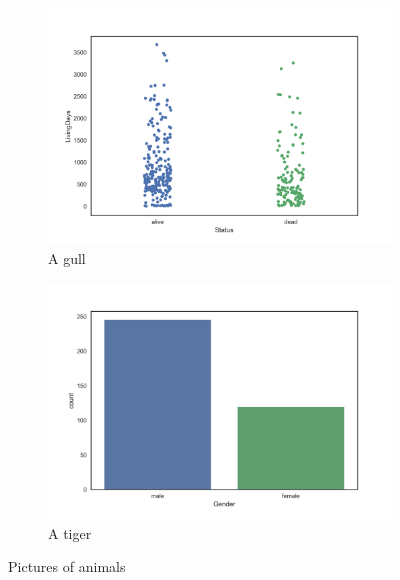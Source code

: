 \documentclass[a4paper,10pt]{article}
\begin{document}
\begin{figure}
    \centering
    \begin{subfigure}[h]{0.45\textwidth}
        \includegraphics[width=1.1\textwidth]{livingstatusandstatus.png}
        \caption{A gull}
        \label{fig:gull}
    \end{subfigure}
    \begin{subfigure}[h]{0.45\textwidth}
        \includegraphics[width=1.1\textwidth]{GenderVSstatus.png}
          \caption{A tiger}
          \label{fig:tiger}
    \end{subfigure}
    \caption{Pictures of animals}\label{fig:animals}
\end{figure}
\end{document}
